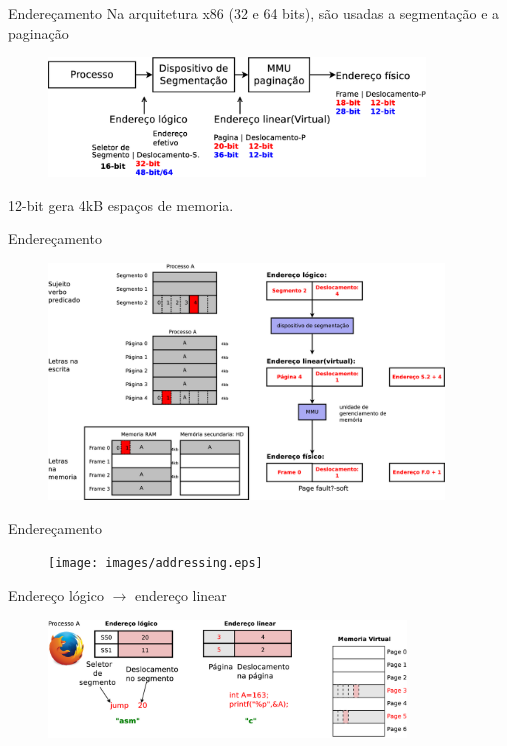 \documentclass[envcountsect,dvips]{beamer}
\begin{document}
\begin{frame}{Endereçamento}
Na arquitetura x86 ({\color{red}32} e {\color{blue}64} bits), são usadas a segmentação e a paginação
\begin{figure}
\centering
\includegraphics[width=10cm]{images/enderecamento.eps}
\label{fig:enderecamento}
\end{figure}
12-bit gera 4kB espaços de memoria.
\end{frame}

\begin{frame}{Endereçamento}
\begin{figure}
\centering
\includegraphics[width=10.5cm]{images/enderecamento2.eps}
\label{fig:enderecamento2}
\end{figure}
\end{frame}

\begin{frame}{Endereçamento}
\begin{figure}
\centering
\texttt{[image: images/addressing.eps]}
\label{fig:addressing}
\end{figure}
\end{frame}

\begin{frame}{Endereço lógico $\rightarrow$ endereço linear}
\begin{figure}
\centering
\includegraphics[width=9.5cm]{images/segmento.eps}
\label{fig:pagina}
\end{figure}
\end{frame}
\end{document}
